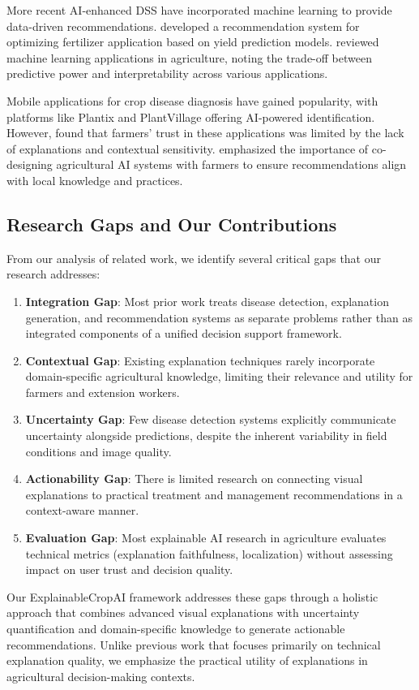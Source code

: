 More recent AI-enhanced DSS have incorporated machine learning to provide data-driven recommendations. \cite{zhang2019crop} developed a recommendation system for optimizing fertilizer application based on yield prediction models. \cite{liakos2018machine} reviewed machine learning applications in agriculture, noting the trade-off between predictive power and interpretability across various applications.

Mobile applications for crop disease diagnosis have gained popularity, with platforms like Plantix and PlantVillage offering AI-powered identification. However, \cite{wright2022adoption} found that farmers' trust in these applications was limited by the lack of explanations and contextual sensitivity. \cite{german2021co} emphasized the importance of co-designing agricultural AI systems with farmers to ensure recommendations align with local knowledge and practices.

\subsection{Research Gaps and Our Contributions}

From our analysis of related work, we identify several critical gaps that our research addresses:

\begin{enumerate}
    \item \textbf{Integration Gap}: Most prior work treats disease detection, explanation generation, and recommendation systems as separate problems rather than as integrated components of a unified decision support framework.
    
    \item \textbf{Contextual Gap}: Existing explanation techniques rarely incorporate domain-specific agricultural knowledge, limiting their relevance and utility for farmers and extension workers.
    
    \item \textbf{Uncertainty Gap}: Few disease detection systems explicitly communicate uncertainty alongside predictions, despite the inherent variability in field conditions and image quality.
    
    \item \textbf{Actionability Gap}: There is limited research on connecting visual explanations to practical treatment and management recommendations in a context-aware manner.
    
    \item \textbf{Evaluation Gap}: Most explainable AI research in agriculture evaluates technical metrics (explanation faithfulness, localization) without assessing impact on user trust and decision quality.
\end{enumerate}

Our ExplainableCropAI framework addresses these gaps through a holistic approach that combines advanced visual explanations with uncertainty quantification and domain-specific knowledge to generate actionable recommendations. Unlike previous work that focuses primarily on technical explanation quality, we emphasize the practical utility of explanations in agricultural decision-making contexts.
